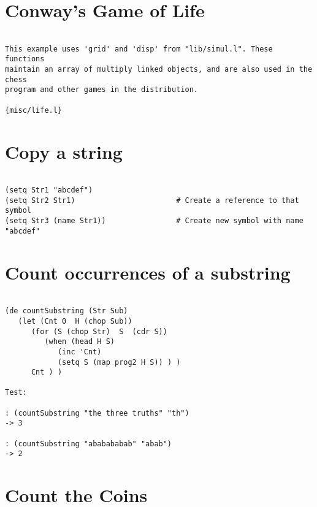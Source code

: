 \section*{Conway's Game of Life}

\begin{verbatim}

This example uses 'grid' and 'disp' from "lib/simul.l". These functions
maintain an array of multiply linked objects, and are also used in the chess
program and other games in the distribution.

{misc/life.l}

\end{verbatim}

\section*{Copy a string}

\begin{verbatim}

(setq Str1 "abcdef")
(setq Str2 Str1)                       # Create a reference to that symbol
(setq Str3 (name Str1))                # Create new symbol with name "abcdef"

\end{verbatim}

\section*{Count occurrences of a substring}

\begin{verbatim}

(de countSubstring (Str Sub)
   (let (Cnt 0  H (chop Sub))
      (for (S (chop Str)  S  (cdr S))
         (when (head H S)
            (inc 'Cnt)
            (setq S (map prog2 H S)) ) )
      Cnt ) )

Test:

: (countSubstring "the three truths" "th")
-> 3

: (countSubstring "ababababab" "abab")
-> 2

\end{verbatim}

\section*{Count the Coins}

